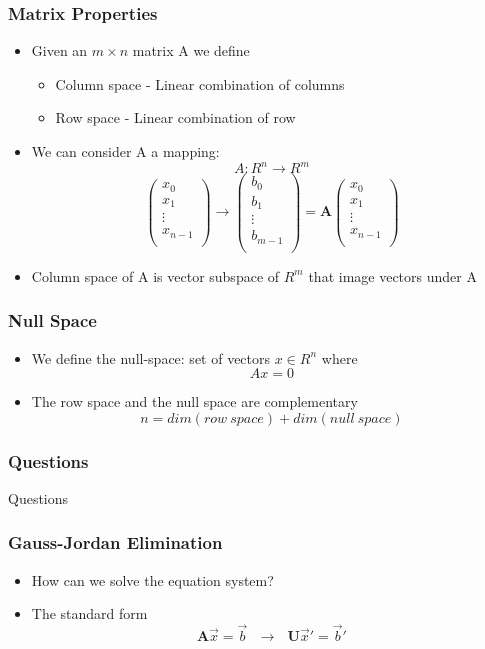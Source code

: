 \documentclass[10pt]{beamer}
\begin{document}
\begin{frame}
  \frametitle{Matrix Properties}
  \begin{itemize}
  \item Given an $m \times n$ matrix A we define
    \begin{itemize}
    \item Column space - Linear combination of columns
    \item Row space - Linear combination of row
    \end{itemize}
  \item We can consider A a mapping:
    \[
      A: R^n \rightarrow R^m
    \]
    \[
      \left(
        \begin{array}{c}
          x_0 \\ x_1 \\ \vdots \\ x_{n-1} \\
        \end{array}
      \right) \rightarrow
      \left(
        \begin{array}{c}
          b_0 \\ b_1 \\ \vdots \\ b_{m-1} \\
        \end{array}
      \right) =
      \mathbf{A}
      \left(
        \begin{array}{c}
          x_0 \\ x_1 \\ \vdots \\ x_{n-1} \\
        \end{array}
      \right)
    \]
  \item Column space of A is vector subspace of $R^m$ that image
    vectors under A
  \end{itemize}
\end{frame}

\begin{frame}
  \frametitle{Null Space}
  \begin{itemize}
  \item We define the null-space: set of vectors $x \in R^n$ where
    \[
      A x = 0
    \]
  \item The row space and the null space are complementary
    \[
      n = dim(row~space) + dim(null~space)
    \]
  \end{itemize}
\end{frame}

\begin{frame}
  \frametitle{Questions}
  \centerline{\Huge Questions}
\end{frame}

\begin{frame}
  \frametitle{Gauss-Jordan Elimination}
  \begin{itemize}
  \item How can we solve the equation system? 
  \item The standard form
    \[
      \mathbf{A} \vec{x} = \vec{b} ~~~ \rightarrow ~~~ \mathbf{U} \vec{x}' = \vec{b}'
    \]
  \end{itemize}
\end{frame}
\end{document}
